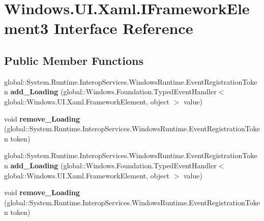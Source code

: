 \hypertarget{interface_windows_1_1_u_i_1_1_xaml_1_1_i_framework_element3}{}\section{Windows.\+U\+I.\+Xaml.\+I\+Framework\+Element3 Interface Reference}
\label{interface_windows_1_1_u_i_1_1_xaml_1_1_i_framework_element3}
\subsection*{Public Member Functions}
\begin{DoxyCompactItemize}
\item 
\mbox{\label{interface_windows_1_1_u_i_1_1_xaml_1_1_i_framework_element3_af1a57f9e8b7276ac201c72be700eef28}} 
global\+::\+System.\+Runtime.\+Interop\+Services.\+Windows\+Runtime.\+Event\+Registration\+Token {\bfseries add\+\_\+\+Loading} (global\+::\+Windows.\+Foundation.\+Typed\+Event\+Handler$<$ global\+::\+Windows.\+U\+I.\+Xaml.\+Framework\+Element, object $>$ value)
\item 
\mbox{\label{interface_windows_1_1_u_i_1_1_xaml_1_1_i_framework_element3_a9fd463d247df0972531c7db2244e6f70}} 
void {\bfseries remove\+\_\+\+Loading} (global\+::\+System.\+Runtime.\+Interop\+Services.\+Windows\+Runtime.\+Event\+Registration\+Token token)
\item 
\mbox{\label{interface_windows_1_1_u_i_1_1_xaml_1_1_i_framework_element3_af1a57f9e8b7276ac201c72be700eef28}} 
global\+::\+System.\+Runtime.\+Interop\+Services.\+Windows\+Runtime.\+Event\+Registration\+Token {\bfseries add\+\_\+\+Loading} (global\+::\+Windows.\+Foundation.\+Typed\+Event\+Handler$<$ global\+::\+Windows.\+U\+I.\+Xaml.\+Framework\+Element, object $>$ value)
\item 
\mbox{\label{interface_windows_1_1_u_i_1_1_xaml_1_1_i_framework_element3_a9fd463d247df0972531c7db2244e6f70}} 
void {\bfseries remove\+\_\+\+Loading} (global\+::\+System.\+Runtime.\+Interop\+Services.\+Windows\+Runtime.\+Event\+Registration\+Token token)

\end{DoxyCompactItemize}
